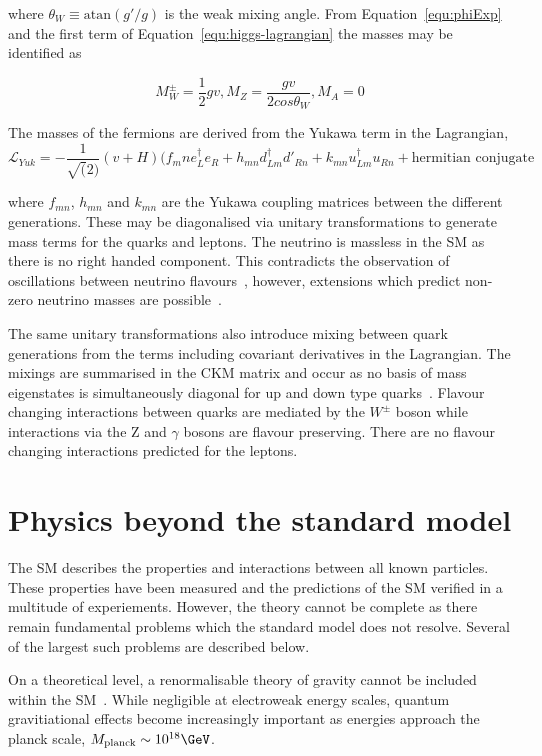 where $\theta_W \equiv \text{atan}(g'/g)$ is the weak mixing angle. From Equation~\ref{equ:phiExp} and
the first term of Equation~\ref{equ:higgs-lagrangian} the masses may be identified as

\begin{equation}
M_W^\pm = \frac{1}{2}gv, M_Z = \frac{gv}{2cos\theta_W}, M_A = 0
\end{equation}

The masses of the fermions are derived from the Yukawa term in the Lagrangian, 
\begin{equation}
\mathcal{L}_{Yuk} = - \frac{1}{\sqrt(2)}(v + H)(f_mn e_L^{\dagger}e_R + h_{mn} d_{Lm}^{\dagger}d'_{Rn} + k_{mn} u_{Lm}^{\dagger}u_{Rn} + \text{hermitian conjugate}
\end{equation}

where $f_{mn}$, $h_{mn}$ and $k_{mn}$ are the Yukawa coupling matrices between the different generations. These may be diagonalised via unitary transformations
to generate mass terms for the quarks and leptons. The neutrino is massless in the SM as there is no right handed component.
This contradicts the observation of oscillations between neutrino flavours~\cite{neutOsc},
however, extensions which predict non-zero neutrino masses are possible~\cite{neutM}. 

The same unitary transformations also introduce mixing between quark generations from the 
terms including covariant derivatives in the Lagrangian. The mixings are summarised in the 
CKM matrix and occur as no basis of mass eigenstates is simultaneously diagonal for 
up and down type quarks~\cite{CKM}. Flavour changing
interactions between quarks are mediated by the $W^{\pm}$ boson while interactions via 
the Z and $\gamma$ bosons are flavour preserving. There are no flavour changing interactions
predicted for the leptons.

\section{Physics beyond the standard model}

The SM describes the properties and interactions between all known particles. These properties 
have been measured and the predictions of the SM verified in a multitude
of experiements. However, the theory cannot be complete 
as there remain fundamental problems which the standard model does not resolve.
Several of the largest such problems are described below.

On a theoretical level, a renormalisable theory of gravity cannot be included within 
the SM~\cite{gravRenorm}. While negligible at electroweak energy
scales, quantum gravitiational effects become increasingly important as
energies approach the planck scale, $M_{\text{planck}} \sim 10^{18} \GeV$. 

